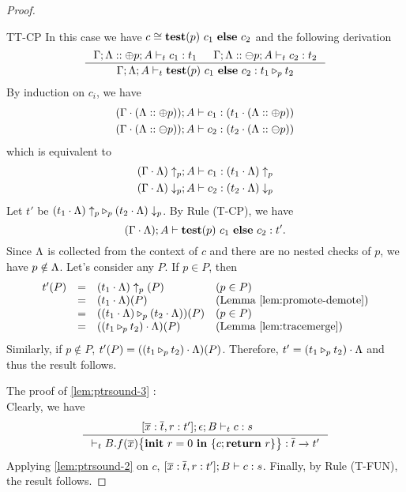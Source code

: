 {{{\begin{proof}
\begin{ProofEnumDesc}
\item[TT-CP] In this case we have $c\cong \lcCP{p}{c_1}{c_2}$ and the following derivation
\begin{equation*}
\inference
{\Gamma;\trace::\tplus p;  A \vdash_{t} c_1 : t_1 &
\Gamma;\trace::\tminus p; A \vdash_{t} c_2 : t_2}
{\Gamma;\trace; A \vdash_{t} \lcCP{p}{c_1}{c_2} : \omerge{p}{t_1}{t_2}}
\end{equation*}
By induction on $c_i$, we have
\begin{gather*}
(\Gamma\cdot(\trace :: \tplus {p}));  A \vdash c_1 : (t_1\cdot(\trace::\tplus{p}) )\\
(\Gamma\cdot (\trace:: \tminus {p})); A \vdash c_2 : (t_2\cdot(\trace::\tminus{ p}))
\end{gather*}
which is equivalent to
\begin{gather*}
(\Gamma\cdot\trace)\uparrow_{p};  A \vdash c_1 : (t_1\cdot\trace)\uparrow_{p}\\
(\Gamma\cdot \trace)\downarrow_{p}; A \vdash c_2 : (t_2\cdot \trace)\downarrow_{p}
\end{gather*}
Let $t'$ be $\omerge{p}{(t_1\cdot\trace)\uparrow_{p}}{(t_2\cdot\trace)\downarrow_{p}}$.
By Rule {(T-CP)}, we have
$$
(\Gamma\cdot\trace);  A \vdash \lcCP{p}{c_1}{c_2} : t'.
$$
Since $\trace$ is collected from the context of $c$ and there are no nested checks of $p$, we have $p\notin \trace$.
Let's consider any $P$.
If $p \in P$, then
$$
\begin{array}{rlll}
t'(P) &=&  (t_1\cdot\trace)\uparrow_{p}(P) & (p\in P)\\
&=& (t_1\cdot\trace)(P) & (\textrm{Lemma \ref{lem:promote-demote}})\\
&=&(\omerge{p}{(t_1\cdot \trace)}{(t_2\cdot \trace)})(P) &(p\in P)\\
&=&((\omerge{p}{t_1}{t_2})\cdot \trace)(P) &(\textrm{Lemma \ref{lem:tracemerge}})\\
\end{array}
$$
Similarly, if $p \notin P$, $t'(P) =((\omerge{p}{t_1}{t_2})\cdot \trace)(P)$.
Therefore,  $t' = (\omerge{p}{t_1}{t_2})\cdot \trace$ and thus the result follows.

\end{ProofEnumDesc}
The proof of \ref{lem:ptrsound-3} :\\
Clearly, we have
\begin{equation*}
\inference
{
[\overline{x}: \overline{t},\lpRES:t'];\epsilon; B \vdash_{t} c : s &
}
{\vdash_{t} \lpPROG{B.f}{\overline{x}}{c}{\lpRES} :  \overline{t}\xrightarrow{} t'}
\end{equation*}
Applying \ref{lem:ptrsound-2} on $c$, $[\overline{x}: \overline{t}, \lpRES:t'] ; B \vdash c : s$.
Finally, by Rule {(T-FUN)}, the result follows.
\end{proof}



}}}
